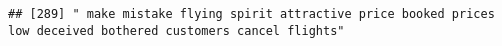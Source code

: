 \documentclass[
]{article}
\begin{document}
\begin{verbatim}
## [289] " make mistake flying spirit attractive price booked prices low deceived bothered customers cancel flights"                                                                                                                                                                                                                                                                                                                                                                                                                                                                                                                                                                                                                                                                                                                                                                                                                                                                                                                                                                                                                                                                                                                                                                                                                                                                                                                                                                                                                                                                                                                                                                                                                                                                                     

\end{verbatim}
\end{document}
